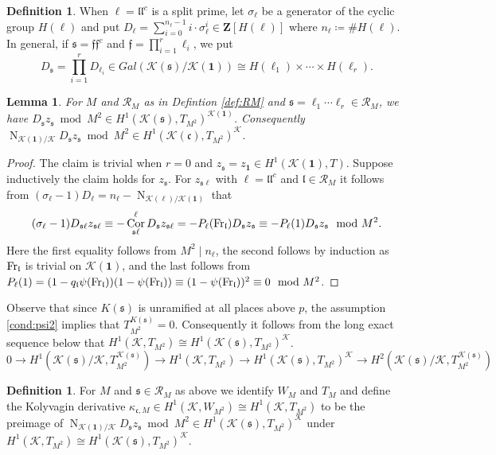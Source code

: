 \documentclass[leqno]{amsart}
\newtheorem{lem}[thm]{Lemma}
\theoremstyle{definition}
\newtheorem{defn}[thm]{Definition}
\theoremstyle{remark}
\newcommand{\id}{\mathbf{1}}
\newcommand{\Z}{{\mathbf{Z}}}
\DeclareMathOperator{\Nr}{N}
\DeclareMathOperator{\Cor}{Cor}
\newcommand{\Fr}{\textnormal{Fr}} %
\newcommand{\fc}{\mathfrak{c}}
\newcommand{\ff}{\mathfrak{f}}
\newcommand{\fl}{\mathfrak{l}}
\newcommand{\fs}{\mathfrak{s}}
\newcommand{\K}{{\mathcal{K}}} %
\begin{document}
\begin{defn}
When $\ell=\fl\fl^c$ is a split prime,
let $\sigma_\ell$
be a generator of the cyclic group
$H(\ell)$ and put 
$D_\ell=\sum_{i=0}^{n_\ell-1}i\cdot \sigma_\ell^i
\in \Z[H(\ell)]$
where $n_\ell\coloneqq\#H(\ell)$.
In general, 
if $\fs=\ff\ff^c$
and $\ff=\prod_{i=1}^r\ell_i$, we put
\[
    D_\fs=\prod_{i=1}^r D_{\ell_i}\in 
    Gal(\K(\fs)/\K(\id))\cong 
    H(\ell_1)\times\cdots\times H(\ell_r).
\]
\end{defn}


\begin{lem}
For $M$ and $\mathcal{R}_M$ as in Defintion \ref{def:RM}
and $\fs=\ell_1\cdots\ell_r\in \mathcal{R}_M$, we have
$D_{\fs}z_{\fs}\bmod M^2\in 
H^1(\K(\fs),T_{M^2})^{\K(\id)}$.
Consequently
$\Nr_{\K(\id)/\K}D_\fs z_\fs\bmod M^2\in
H^1(\K(\fc),T_{M^2})^{\K}$.
\end{lem}
\begin{proof}
The claim is trivial when $r=0$
and $z_{\fs}=z_\id\in H^1(\K(\id),T)$.
Suppose inductively the claim holds for $z_\fs$.
For $z_{\fs\ell}$ with $\ell=\fl\fl^c$ and $\fl\in \mathcal{R}_M$
it follows from 
$(\sigma_\ell-1)D_\ell=n_\ell-\Nr_{\K(\ell)/\K(\id)}$
that
\[
	 (\sigma_\ell-1)D_{\fs\ell}z_{\fs\ell}\equiv
	 -\Cor_{\fs\ell}^{\ell}D_{\fs}z_{\fs\ell}=
	 -P_\ell(\Fr_{\fl})D_{\fs}z_{\fs} \equiv
	 -P_\ell(1)D_{\fs}z_{\fs}\mod M^2.
\]
Here the first equality follows from $M^2\mid n_\ell$,
the second follows by induction 
as $\Fr_\fl$ is trivial on $\K(\id)$,
and the last follows from 
$P_\ell(1)=(1-q_\fl\psi(\Fr_\fl))(1-\psi(\Fr_\fl))
\equiv (1-\psi(\Fr_\fl))^2 \equiv 0\mod M^2$.
\end{proof}

Observe that since $K(\fs)$ is 
unramified at all places above $p$,
the assumption \eqref{cond:psi2}
implies that $T_{M^2}^{K(\fs)}=0$.
Consequently it follows from the long exact sequence below
that $H^1(\K, T_{M^2})\cong H^1(\K(\fs), T_{M^2})^{\K}$.
\[
	0\to H^1(\K(\fs)/\K, T_{M^2}^{\K(\fs)})\to
	H^1(\K, T_{M^2})\to
	H^1(\K(\fs), T_{M^2})^{\K}\to
	H^2(\K(\fs)/\K, T_{M^2}^{\K(\fs)})
\]

\begin{defn}
For $M$ and $\fs\in\mathcal{R}_M$ as above
we identify $W_M$ and $T_M$ and
define the Kolyvagin derivative 
$\kappa_{\fc,M}\in H^1(\K,W_{M^2})\cong H^1(\K,T_{M^2})$
to be the preimage of 
$\Nr_{\K(\id)/\K}D_{\fs}z_{\fs} \bmod M^2\in 
H^1(\K(\fs), T_{M^2})^{\K}$
under 
$H^1(\K, T_{M^2})\cong H^1(\K(\fs), T_{M^2})^{\K}$.
\end{defn}
\end{document}
